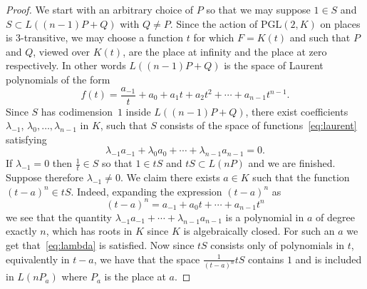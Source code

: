 \documentclass[ALCO,Unicode,ThmDefs]{cedram}
\begin{document}
\begin{proof}
We start with an arbitrary choice of $P$ so that we may suppose $1\in S$ and $S\subset L((n-1)P+Q)$ with $Q\neq P$. Since the action of $\mathrm{PGL}(2,K)$ on places is $3$-transitive, we may choose a function $t$ for which $F=K(t)$ and such that $P$ and $Q$, viewed over $K(t)$, are the place at infinity and the place at zero respectively. In other words $L((n-1)P+Q)$ is the space of Laurent polynomials of the form
\begin{equation}\label{eq:laurent}
f(t)=\frac {a_{-1}} t + a_0 + a_1 t + a_2 t^2 + \cdots + a_{n-1} t^{n-1}.
\end{equation}
Since $S$ has codimension~$1$ inside $L((n-1)P+Q)$, there exist coefficients $\lambda_{-1}$, $\lambda_0,\ldots,\lambda_{n-1}$ in $K$, such that $S$ consists of the space of functions~\eqref{eq:laurent} satisfying
\begin{equation}\label{eq:lambda}
\lambda_{-1}a_{-1}+\lambda_0a_0+\cdots + \lambda_{n-1}a_{n-1}=0.
\end{equation}
If $\lambda_{-1}=0$ then $\frac{1}{t}\in S$ so that $1\in tS$ and $tS\subset L(nP)$ and we are finished. Suppose therefore $\lambda_{-1}\neq 0$. We claim there exists $a\in K$ such that the function $(t-a)^n\in tS$. Indeed, expanding the expression $(t-a)^n$ as
\[
(t-a)^n=a_{-1}+a_0t+\cdots +a_{n-1}t^n
\]
we see that the quantity $\lambda_{-1}a_{-1}+\cdots +
\lambda_{n-1}a_{n-1}$ is a polynomial in $a$ of degree exactly $n$, which has roots in $K$ since $K$ is algebraically closed. For such an $a$ we get that~\eqref{eq:lambda} is satisfied. Now since $tS$ consists only of polynomials in $t$, equivalently in $t-a$, we have that the space $\frac 1{(t-a)^n}tS$ contains $1$ and is included in $L(nP_a)$ where $P_a$ is the place at $a$.
\end{proof}
\end{document}
